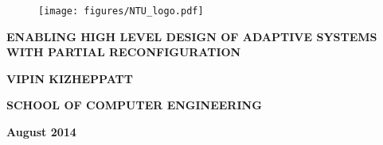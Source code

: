 \begin{titlepage}
\begin{center}
\begin{figure}[!t]
\centering
\texttt{[image: figures/NTU\_logo.pdf]}
\end{figure} 
\vspace*{1.5in}
{\large\bf ENABLING HIGH LEVEL DESIGN OF ADAPTIVE SYSTEMS WITH PARTIAL RECONFIGURATION}
\par
\vspace{3 in}
{\large\bf VIPIN KIZHEPPATT}
\vspace{0.5 cm}
\par
{\large\bf SCHOOL OF COMPUTER ENGINEERING}
\par
{\large\bf August 2014}
\end{center}
\end{titlepage}